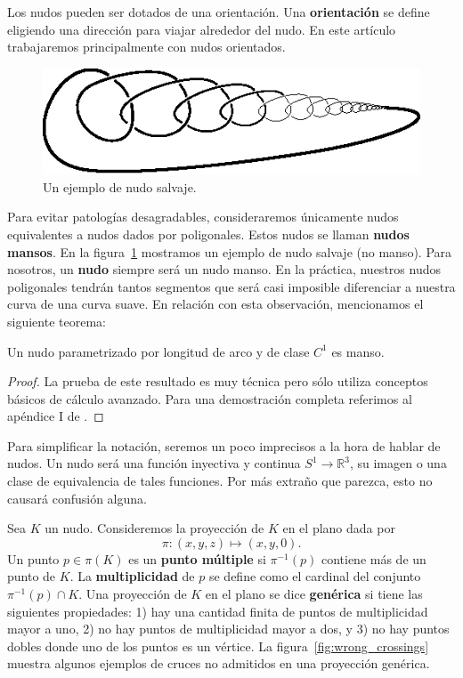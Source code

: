 \documentclass[graybox]{svmult}
\newcommand{\R}{\mathbb{R}}
\begin{document}
Los nudos pueden ser dotados de una orientación.  Una \textbf{orientación} se
define eligiendo una dirección para viajar alrededor del nudo. En este artículo
trabajaremos principalmente con nudos orientados.
		
\begin{figure}
	\centering
	\includegraphics[scale=0.7]{images/wild}
	\caption{Un ejemplo de nudo salvaje.}
	\label{fig:wild}
\end{figure}

	 Para evitar patologías desagradables, consideraremos
	 únicamente nudos equivalentes a nudos dados por poligonales. Estos nudos se
	 llaman \textbf{nudos mansos}.  En la figura~\ref{fig:wild} mostramos un
	 ejemplo de nudo salvaje (no manso). Para nosotros, un \textbf{nudo} siempre
	 será un nudo manso. 
	 En la práctica, nuestros nudos poligonales tendrán tantos segmentos que
	 será casi imposible diferenciar a nuestra curva de una curva suave.  En
	 relación con esta observación, mencionamos el siguiente teorema:

    \begin{theorem}
        Un nudo parametrizado por longitud de arco y de clase $C^1$ es manso.
    \end{theorem}

    \begin{proof}
		La prueba de este resultado es muy técnica pero sólo utiliza conceptos
		básicos de cálculo avanzado.  Para una demostración completa referimos
		al apéndice I de \cite{MR0445489}.
    \end{proof}

	Para simplificar la notación, seremos un poco imprecisos a la hora
    de hablar de nudos.  Un nudo será una función inyectiva y
    continua $S^1\to\R^3$, su imagen o 
	una clase de equivalencia de tales funciones. 
	Por
    más extraño que parezca, esto no causará confusión alguna.

	Sea $K$ un nudo.  Consideremos la proyección de $K$ en el plano dada por
    \[
	\pi\colon(x,y,z)\mapsto(x,y,0).
	\]
	Un punto $p\in\pi(K)$ es un \textbf{punto
    múltiple} si $\pi^{-1}(p)$ contiene más de un punto de $K$. La
    \textbf{multiplicidad} de $p$ se define como el cardinal del conjunto
    $\pi^{-1}(p)\cap K$. Una proyección de $K$ en el plano se dice
    \textbf{genérica} si tiene las siguientes propiedades: 1) hay una cantidad finita de puntos
    de multiplicidad mayor a uno, 2) no hay puntos de multiplicidad mayor a
    dos, y 3) no hay puntos dobles donde uno de los puntos es un vértice. La
    figura~\ref{fig:wrong_crossings} muestra algunos ejemplos de cruces no
    admitidos en una proyección genérica.
 
\end{document}
